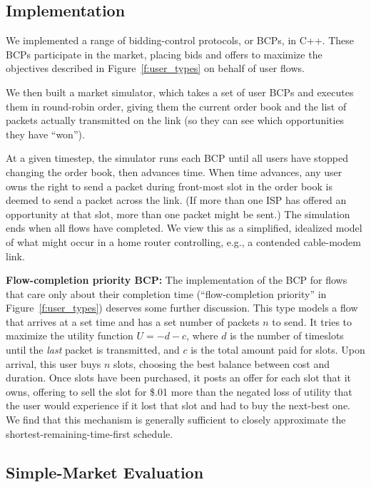 \subsection{Implementation}
We implemented a range of bidding-control protocols, or BCPs, in
C++. These BCPs participate in the market, placing bids and offers to
maximize the objectives described in Figure~\ref{f:user_types} on
behalf of user flows.

We then built a market simulator, which takes a set of user BCPs
and executes them in round-robin order, giving them the current order
book and the list of packets actually transmitted on the link (so they
can see which opportunities they have ``won'').

At a given timestep, the simulator runs each BCP until all users have
stopped changing the order book, then advances time. When time
advances, any user owns the right to send a packet during front-most
slot in the order book is deemed to send a packet across the link. (If more than one
ISP has offered an opportunity at that slot, more than one packet
might be sent.) The simulation ends when all flows have
completed. We view this as a simplified, idealized model of what might
occur in a home router controlling, e.g., a contended cable-modem link.

\textbf{Flow-completion priority BCP:} The implementation of the
BCP for flows that care only about their completion time
(``flow-completion priority'' in Figure~\ref{f:user_types}) deserves
some further discussion. This type models a flow that arrives at a set
time and has a set number of packets $n$ to send. It tries to maximize
the utility function $U = -d - c$, where $d$ is the number of
timeslots until the \emph{last} packet is transmitted, and $c$ is the
total amount paid for slots.  Upon arrival, this user buys $n$
slots, choosing the best balance between cost and duration. Once slots have been
purchased, it posts an offer for each slot that it owns, offering
to sell the slot for \$.01
more than the negated loss of utility that the user would experience if it lost
that slot and had to buy the next-best one. We find that this mechanism
is generally sufficient to closely approximate the shortest-remaining-time-first schedule.

\subsection{Simple-Market Evaluation}
\label{ss:eval}

